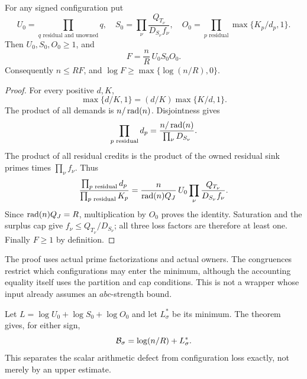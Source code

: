 \begin{theorem}\label{signed:thm:loss}
For any signed configuration put
\[
 U_0=\prod_{q\text{ residual and unowned}}q,\quad
 S_0=\prod_\nu\frac{Q_{T_\nu}}{D_{S_\nu}f_\nu},\quad
 O_0=\prod_{p\text{ residual}}\max\{K_p/d_p,1\}.
\]
Then \(U_0,S_0,O_0\ge1\), and
\begin{equation}\label{signed:eq:loss}
 \boxed{F=\frac nR\,U_0S_0O_0.}
\end{equation}
Consequently \(n\le RF\), and \(\log F\ge\max\{\log(n/R),0\}\).
\end{theorem}
\begin{proof}
For every positive \(d,K\),
\[
 \max\{d/K,1\}=(d/K)\max\{K/d,1\}.
\]
The product of all demands is \(n/\operatorname{rad}(n)\). Disjointness gives
\[
 \prod_{p\text{ residual}}d_p
 =\frac{n/\operatorname{rad}(n)}{\prod_\nu D_{S_\nu}}.
\]
The product of all residual credits is the product of the owned residual sink primes times \(\prod_\nu f_\nu\). Thus
\[
 \frac{\prod_{p\text{ residual}}d_p}{\prod_{p\text{ residual}}K_p}
 =\frac{n}{\operatorname{rad}(n)Q_J}\,
 U_0\prod_\nu\frac{Q_{T_\nu}}{D_{S_\nu}f_\nu}.
\]
Since \(\operatorname{rad}(n)Q_J=R\), multiplication by \(O_0\) proves the identity. Saturation and the surplus cap give \(f_\nu\le Q_{T_\nu}/D_{S_\nu}\); all three loss factors are therefore at least one. Finally \(F\ge1\) by definition.
\end{proof}
The proof uses actual prime factorizations and actual owners. The congruences restrict which configurations may enter the minimum, although the accounting equality itself uses the partition and cap conditions. This is not a wrapper whose input already assumes an \(abc\)-strength bound.

Let \(L=\log U_0+\log S_0+\log O_0\) and let \(L^*_\sigma\) be its minimum. The theorem gives, for either sign,
\begin{equation}\label{signed:eq:Lstar}
 \mathcal B_\sigma=\log(n/R)+L^*_\sigma.
\end{equation}
This separates the scalar arithmetic defect from configuration loss exactly, not merely by an upper estimate.

